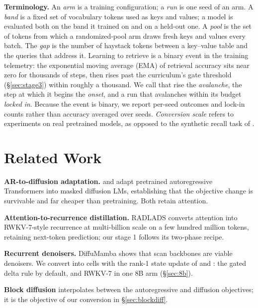 \documentclass{article}
\begin{document}
\textbf{Terminology.} An \emph{arm} is a training configuration; a \emph{run} is one seed of an arm. A \emph{band} is a fixed set of vocabulary tokens used as keys and values; a model is evaluated both on the band it trained on and on a held-out one. A \emph{pool} is the set of tokens from which a randomized-pool arm draws fresh keys and values every batch. The \emph{gap} is the number of haystack tokens between a key--value table and the queries that address it. Learning to retrieve is a binary event in the training telemetry: the exponential moving average (EMA) of retrieval accuracy sits near zero for thousands of steps, then rises past the curriculum's gate threshold (\S\ref{sec:stage3}) within roughly a thousand. We call that rise the \emph{avalanche}, the step at which it begins the \emph{onset}, and a run that avalanches within its budget \emph{locked in}. Because the event is binary, we report per-seed outcomes and lock-in counts rather than accuracy averaged over seeds. \emph{Conversion scale} refers to experiments on real pretrained models, as opposed to the synthetic recall task of \citet{anatomyrecall}.

\section{Related Work}\label{sec:related}

\textbf{AR-to-diffusion adaptation.} \citet{gong2025diffullama} and \citet{ye2025dream} adapt pretrained autoregressive Transformers into masked diffusion LMs, establishing that the objective change is survivable and far cheaper than pretraining. Both retain attention.

\textbf{Attention-to-recurrence distillation.} RADLADS \citep{goldstein2025radlads} converts attention into RWKV-7-style recurrence at multi-billion scale on a few hundred million tokens, retaining next-token prediction; our stage 1 follows its two-phase recipe.

\textbf{Recurrent denoisers.} DiffuMamba \citep{singh2025diffumamba} shows that scan backbones are viable denoisers. We convert into cells with the rank-1 state update of \citet{yang2024gateddeltanet} and \citet{peng2025rwkv7}: the gated delta rule by default, and RWKV-7 in one $8$B arm (\S\ref{sec:8b}).

\textbf{Block diffusion} \citep{arriola2025bd3lm} interpolates between the autoregressive and diffusion objectives; it is the objective of our conversion in \S\ref{sec:blockdiff}.
\end{document}
